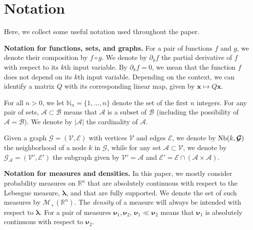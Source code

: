 \documentclass[twoside,11pt]{article}
\newcommand{\borelm}{\mathscr{M}}
\newcommand{\borelmp}{\borelm_+}
\newcommand{\lebm}{\boldsymbol{\lambda} } %
\newcommand{\genm}{\boldsymbol{\nu} }   %
\newcommand{\re}{\mathbb{R}}
\newcommand{\Bc}{\mathcal{B}}
\newcommand{\Vc}{\mathcal{V}}
\newcommand{\Ec}{\mathcal{E}}
\newcommand{\Ac}{\mathcal{A}}
\newcommand{\xb}{\boldsymbol{x}}
\newcommand{\Gcb}{\boldsymbol{\mathcal{G}}}
\newcommand{\neigh}{ {\rm Nb} }
\begin{document}
\section{Notation}
%
%
\label{sec:notation} 
%
%
%
%
Here, we collect some
useful notation used throughout the paper.
%
%
%
%
%

{\bf Notation for functions, sets, and graphs.}
%
For a pair of functions $f$ and $g$, we denote their composition by
$f \circ g$.
We denote by $\partial_k f$ the partial derivative of $f$ with
respect to its $k$th input variable.
%
%
%
By $\partial_k f = 0$, we mean
that the function $f$ does not depend on its $k$th input variable.
Depending on the context,
we can  identify a matrix $Q$ with its corresponding linear map, given by
$\xb \mapsto Q \xb$. 
%

For all $n>0$, we let $\mathbb{N}_n=\{1,\ldots,n\}$ denote the set
of the first $n$ integers.
For any pair of sets, $\Ac \subset \Bc$ means that $\Ac$ 
is a subset of $\Bc$ (including the possibility of $\Ac = \Bc$).
%
%
We denote by $\vert \Ac \vert$ the cardinality of $\Ac$.

Given a graph $\Gcb=(\Vc, \Ec)$ with vertices
$\Vc$ and edges $\Ec$, we denote by $\neigh (k,\Gcb)$ the
neighborhood of a node $k$ in $\Gcb$, while for 
any set $\Ac \subset \Vc$, we denote by
$\Gcb_{\Ac}=(\Vc', \Ec')$ the subgraph  given by
$\Vc' = \Ac$ and $\Ec' = \Ec \cap (\Ac \times \Ac)$.
%

%
%
%
%

{\bf Notation for measures and densities.} 
%
In this paper, we mostly consider  probability measures on
$\re^n$
%
%
that are absolutely
continuous with respect to the Lebesgue measure, $\lebm$, and that
are fully supported.
%
%
%
%
%
%
%
%
%
%
%
%
%
%
%
We denote the set of such measures by 
$\borelmp(\re^n)$.
%
%
%
%
%
%
%
%
The {\it density} of a measure will  always be intended 
with respect to $\lebm$.
%
%
%
%
%
%
%
%
%
%
%
%
%
%
%
%
%
%
%
%
%
%
%
%
%
%
%
%
%
%
%
%
%
%
%
For a pair of measures $\genm_1,\genm_2$, 
$\genm_1 \ll \genm_2$ means that $\genm_1$ is
absolutely continuous with respect to $\genm_2$.
%
%
\end{document}
